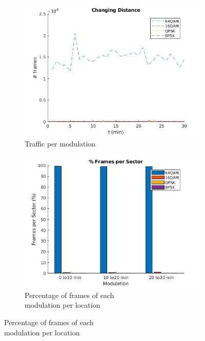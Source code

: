 \documentclass[12]{article}
\begin{document}
\begin{figure}[!htb]
\hspace*{-3cm}
\begin{subfigure}{.5\textwidth}
  \centering
  \includegraphics[width=\linewidth]{"measurement 2/g_dev1fig1"}
  \caption{Traffic per modulation}
  \label{fig:g_meas2_sub1}
\end{subfigure}%
\hspace*{-0.6cm}
\begin{subfigure}{.5\textwidth}
  \includegraphics[width=\linewidth]{"measurement 2/g_dev1fig2"}
  \caption{Percentage of frames of each\\ modulation per location}
  \label{fig:g_meas2_sub2}
\end{subfigure}%

\end{figure}
\end{document}
